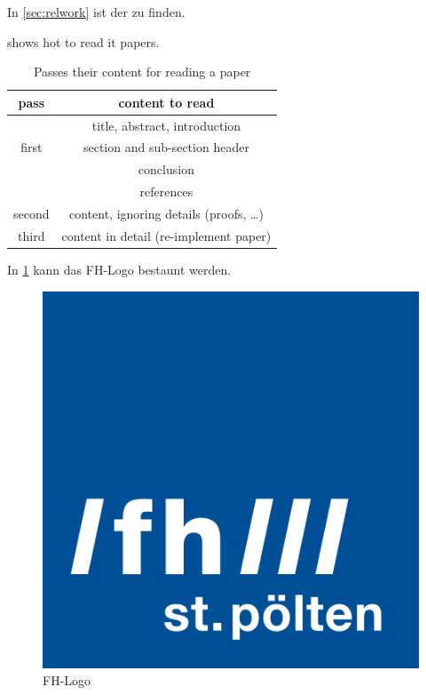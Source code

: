 
In \autoref{sec:relwork} ist der  zu finden.


 shows hot to read \gls{it} papers.

\begin{table}[h]
\centering
\begin{tabular}{|c|c|}
    \hline
    \textbf{pass} & \textbf{content to read} \\ \hline
    \multirow{3}{*}{first} & title, abstract, introduction \\ \cline{2-2}
                           & section and sub-section header \\ \cline{2-2}
                           & conclusion \\ \cline{2-2}
                           & references \\ \hline
    second & content, ignoring details (proofs, \ldots{}) \\ \hline
    third & content in detail (re-implement paper) \\ \hline
\end{tabular}
\caption{Passes their content for reading a paper}\label{tab:passes_paperreading}
\end{table}


In \cref{fig:fhlogo} kann das FH-Logo bestaunt werden.

\begin{figure}[ht]
    \centering
    \includegraphics[scale=0.2]{gfx/fh_logo}
    \caption{FH-Logo}\label{fig:fhlogo}
\end{figure}


